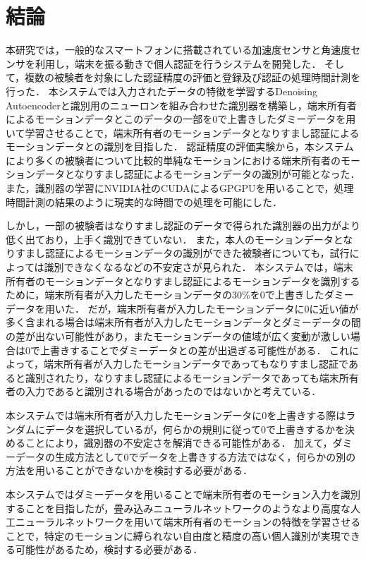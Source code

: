 \chapter{結論}
本研究では，一般的なスマートフォンに搭載されている加速度センサと角速度センサを利用し，端末を振る動きで個人認証を行うシステムを開発した．
そして，複数の被験者を対象にした認証精度の評価と登録及び認証の処理時間計測を行った．
本システムでは入力されたデータの特徴を学習するDenoising Autoencoderと識別用のニューロンを組み合わせた識別器を構築し，端末所有者によるモーションデータとこのデータの一部を0で上書きしたダミーデータを用いて学習させることで，端末所有者のモーションデータとなりすまし認証によるモーションデータとの識別を目指した．
認証精度の評価実験から，本システムにより多くの被験者について比較的単純なモーションにおける端末所有者のモーションデータとなりすまし認証によるモーションデータの識別が可能となった．
また，識別器の学習にNVIDIA社のCUDAによるGPGPUを用いることで，処理時間計測の結果のように現実的な時間での処理を可能にした．

しかし，一部の被験者はなりすまし認証のデータで得られた識別器の出力がより低く出ており，上手く識別できていない．
また，本人のモーションデータとなりすまし認証によるモーションデータの識別ができた被験者についても，試行によっては識別できなくなるなどの不安定さが見られた．
本システムでは，端末所有者のモーションデータとなりすまし認証によるモーションデータを識別するために，端末所有者が入力したモーションデータの30\%を0で上書きしたダミーデータを用いた．
だが，端末所有者が入力したモーションデータに0に近い値が多く含まれる場合は端末所有者が入力したモーションデータとダミーデータの間の差が出ない可能性があり，またモーションデータの値域が広く変動が激しい場合は0で上書きすることでダミーデータとの差が出過ぎる可能性がある．
これによって，端末所有者が入力したモーションデータであってもなりすまし認証であると識別されたり，なりすまし認証によるモーションデータであっても端末所有者の入力であると識別される場合があったのではないかと考えている．

本システムでは端末所有者が入力したモーションデータに0を上書きする際はランダムにデータを選択しているが，何らかの規則に従って0で上書きするかを決めることにより，識別器の不安定さを解消できる可能性がある．
加えて，ダミーデータの生成方法として0でデータを上書きする方法ではなく，何らかの別の方法を用いることができないかを検討する必要がある．

本システムではダミーデータを用いることで端末所有者のモーション入力を識別することを目指したが，畳み込みニューラルネットワークのようなより高度な人工ニューラルネットワークを用いて端末所有者のモーションの特徴を学習させることで，特定のモーションに縛られない自由度と精度の高い個人識別が実現できる可能性があるため，検討する必要がある．

